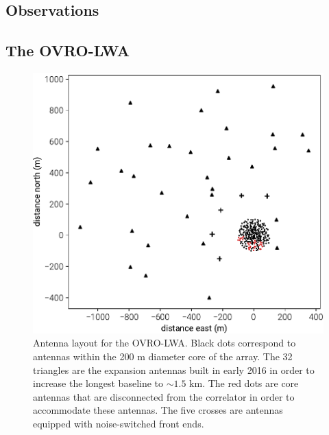 \begin{bibunit}
\section{Observations}\label{sec:observations1}

\subsection{The OVRO-LWA}

\begin{figure}[t]
    \includegraphics[width=\columnwidth]{figures/chapter3/antenna-layout}
    \caption{
        Antenna layout for the OVRO-LWA. Black dots correspond to antennas within the 200 m diameter
        core of the array. The 32 triangles are the expansion antennas built in early 2016 in order
        to increase the longest baseline to $\sim1.5$ km. The red dots are core antennas that are
        disconnected from the correlator in order to accommodate these antennas. The five crosses
        are antennas equipped with noise-switched front ends.
    }
    \label{fig:antenna-layout}
\end{figure}


\end{bibunit}
